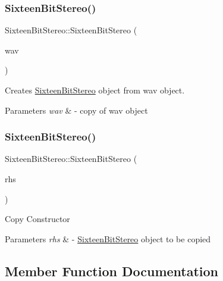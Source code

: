 \subsubsection{\texorpdfstring{Sixteen\+Bit\+Stereo()}{SixteenBitStereo()}\hspace{0.1cm}{\footnotesize\ttfamily [1/2]}}
{\footnotesize\ttfamily Sixteen\+Bit\+Stereo\+::\+Sixteen\+Bit\+Stereo (\begin{DoxyParamCaption}\item[{const \hyperlink{classWav}{Wav} \&}]{wav }\end{DoxyParamCaption})}

Creates \hyperlink{classSixteenBitStereo}{Sixteen\+Bit\+Stereo} object from wav object.


\begin{DoxyParams}{Parameters}
{\em wav} & -\/ copy of wav object \\
\hline
\end{DoxyParams}
\mbox{\label{classSixteenBitStereo_a0cf6266f0f86836c16cf3b278c6466b9}} 
\subsubsection{\texorpdfstring{Sixteen\+Bit\+Stereo()}{SixteenBitStereo()}\hspace{0.1cm}{\footnotesize\ttfamily [2/2]}}
{\footnotesize\ttfamily Sixteen\+Bit\+Stereo\+::\+Sixteen\+Bit\+Stereo (\begin{DoxyParamCaption}\item[{const \hyperlink{classSixteenBitStereo}{Sixteen\+Bit\+Stereo} \&}]{rhs }\end{DoxyParamCaption})}

Copy Constructor


\begin{DoxyParams}{Parameters}
{\em rhs} & -\/ \hyperlink{classSixteenBitStereo}{Sixteen\+Bit\+Stereo} object to be copied \\
\hline
\end{DoxyParams}


\subsection{Member Function Documentation}
\mbox{\label{classSixteenBitStereo_a212fa2366d2dc762a4bdf461be1c76b2}} 
